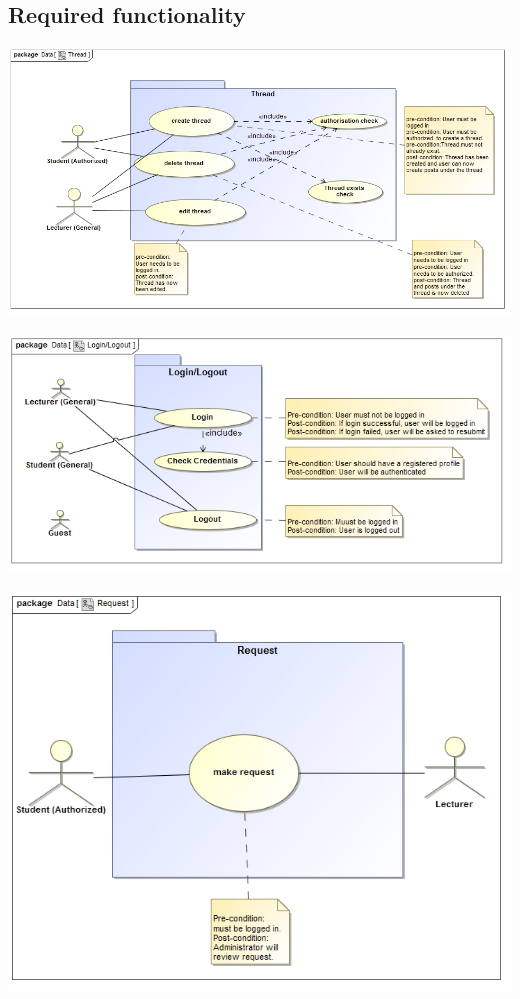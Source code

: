 \documentclass[12pt, oneside]{article}
\begin{document}
	\subsection{Required functionality}
	\begin{center}

			 \includegraphics[scale=0.5]{thread}
			 
			 \includegraphics[scale=0.6]{Login_Logout} 
			 
			 \includegraphics[scale=0.6]{Request}


\end{center}
\end{document}
